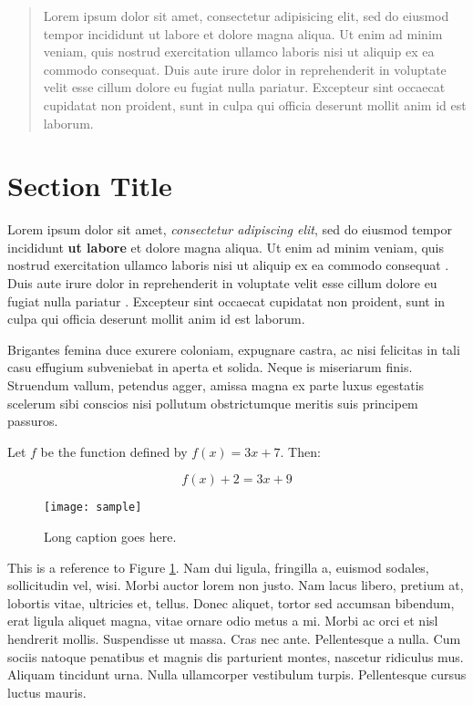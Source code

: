 \begin{abstract}
   \noindent Lorem ipsum dolor sit amet, consectetur adipisicing elit, sed do eiusmod tempor incididunt ut labore et dolore magna aliqua. Ut enim ad minim veniam, quis nostrud exercitation ullamco laboris nisi ut aliquip ex ea commodo consequat. Duis aute irure dolor in reprehenderit in voluptate velit esse cillum dolore eu fugiat nulla pariatur. Excepteur sint occaecat cupidatat non proident, sunt in culpa qui officia deserunt mollit anim id est laborum.

\end{abstract}

\section{Section Title}
Lorem ipsum dolor sit amet, \emph{consectetur adipiscing elit}, sed do eiusmod tempor incididunt \textbf{ut labore} et dolore magna aliqua. Ut enim ad minim veniam, quis nostrud exercitation ullamco laboris nisi ut aliquip ex ea commodo consequat \cite{foo}. Duis aute irure dolor in reprehenderit in voluptate velit esse cillum dolore eu fugiat nulla pariatur \cite{bar}. Excepteur sint occaecat cupidatat non proident, sunt in culpa qui officia deserunt mollit anim id est laborum.

Brigantes femina duce exurere coloniam, expugnare castra, ac nisi felicitas in tali casu effugium subveniebat in aperta et solida. Neque is miseriarum finis. Struendum vallum, petendus agger, amissa magna ex parte luxus egestatis scelerum sibi conscios nisi pollutum obstrictumque meritis suis principem passuros.

Let $f$ be the function defined by $f(x) = 3x + 7$. Then:

\begin{equation}
    f(x) + 2 = 3x + 9
\end{equation}

\begin{figure}
    \centering
    \texttt{[image: sample]}
    \caption[Short caption]{Long caption goes here.}
    \label{fig:foo}
\end{figure}

This is a reference to Figure \ref{fig:foo}. Nam dui ligula, fringilla a, euismod sodales, sollicitudin vel, wisi. Morbi auctor lorem non justo. Nam lacus libero, pretium at, lobortis vitae, ultricies et, tellus. Donec aliquet, tortor sed accumsan bibendum, erat ligula aliquet magna, vitae ornare odio metus a mi. Morbi ac orci et nisl hendrerit mollis. Suspendisse ut massa. Cras nec ante. Pellentesque a nulla. Cum sociis natoque penatibus et magnis dis parturient montes, nascetur ridiculus mus. Aliquam tincidunt urna. Nulla ullamcorper vestibulum turpis. Pellentesque cursus luctus mauris.

